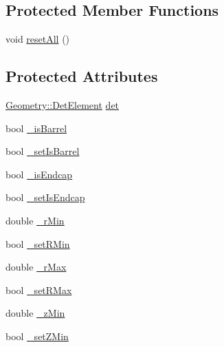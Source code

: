 \subsection*{Protected Member Functions}
\begin{DoxyCompactItemize}
\item 
void \hyperlink{class_d_d4hep_1_1_d_d_rec_1_1_subdetector_extension_impl_aadfe7c78e6a5d977d9d2f9d6a6222618}{resetAll} ()
\end{DoxyCompactItemize}
\subsection*{Protected Attributes}
\begin{DoxyCompactItemize}
\item 
\hyperlink{class_d_d4hep_1_1_geometry_1_1_det_element}{Geometry::DetElement} \hyperlink{class_d_d4hep_1_1_d_d_rec_1_1_subdetector_extension_impl_a5573895361adac8070eb23454538d76e}{det}
\item 
bool \hyperlink{class_d_d4hep_1_1_d_d_rec_1_1_subdetector_extension_impl_aca8d64e7e01c75f25020bcb13b68ba76}{\_\-isBarrel}
\item 
bool \hyperlink{class_d_d4hep_1_1_d_d_rec_1_1_subdetector_extension_impl_a5044a5f0bffb6967aa75c1486d7e0403}{\_\-setIsBarrel}
\item 
bool \hyperlink{class_d_d4hep_1_1_d_d_rec_1_1_subdetector_extension_impl_ab4ac574b15b70218b3c101314002d390}{\_\-isEndcap}
\item 
bool \hyperlink{class_d_d4hep_1_1_d_d_rec_1_1_subdetector_extension_impl_ab96ac61e873d487a1837b4abe156869e}{\_\-setIsEndcap}
\item 
double \hyperlink{class_d_d4hep_1_1_d_d_rec_1_1_subdetector_extension_impl_a01b803bfceeeff565ed7728e6292ecb6}{\_\-rMin}
\item 
bool \hyperlink{class_d_d4hep_1_1_d_d_rec_1_1_subdetector_extension_impl_aa2540f465262ee20af21a1dae2a33f12}{\_\-setRMin}
\item 
double \hyperlink{class_d_d4hep_1_1_d_d_rec_1_1_subdetector_extension_impl_ac9a17365ea087ce3a3b9dbec6b514f14}{\_\-rMax}
\item 
bool \hyperlink{class_d_d4hep_1_1_d_d_rec_1_1_subdetector_extension_impl_a8a23eb897b7a367cd183adddf88e8fe7}{\_\-setRMax}
\item 
double \hyperlink{class_d_d4hep_1_1_d_d_rec_1_1_subdetector_extension_impl_a33f8e745fb1bf3a861f69c1f3585c8b9}{\_\-zMin}
\item 
bool \hyperlink{class_d_d4hep_1_1_d_d_rec_1_1_subdetector_extension_impl_a7f2f6db8f2c5f98b732bcea3a452a12f}{\_\-setZMin}

\end{DoxyCompactItemize}
